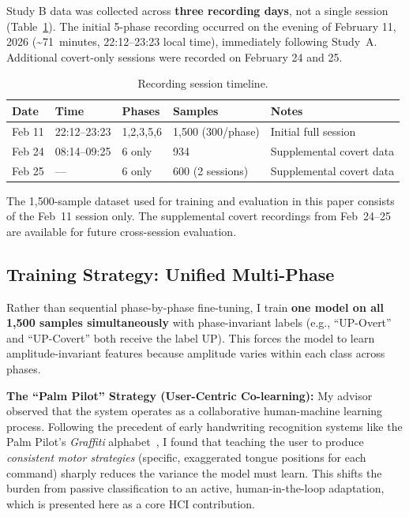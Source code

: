 \documentclass{article}
\begin{document}
Study B data was collected across \textbf{three recording days}, not a single session (Table~\ref{tab:sessions}). The initial 5-phase recording occurred on the evening of February 11, 2026 (\textasciitilde71~minutes, 22:12--23:23 local time), immediately following Study~A. Additional covert-only sessions were recorded on February 24 and 25.

\begin{table}[h]
\centering
\caption{Recording session timeline.}
\label{tab:sessions}
\begin{tabular}{@{}lllll@{}}
\toprule
Date & Time & Phases & Samples & Notes \\
\midrule
Feb 11 & 22:12--23:23 & 1,2,3,5,6 & 1{,}500 (300/phase) & Initial full session \\
Feb 24 & 08:14--09:25 & 6 only      & 934 & Supplemental covert data \\
Feb 25 & ---          & 6 only      & 600 (2 sessions) & Supplemental covert data \\
\bottomrule
\end{tabular}
\end{table}

The 1{,}500-sample dataset used for training and evaluation in this paper consists of the Feb~11 session only. The supplemental covert recordings from Feb~24--25 are available for future cross-session evaluation.

\subsection{Training Strategy: Unified Multi-Phase}

Rather than sequential phase-by-phase fine-tuning, I train \textbf{one model on all 1{,}500 samples simultaneously} with phase-invariant labels (e.g., ``UP-Overt'' and ``UP-Covert'' both receive the label UP). This forces the model to learn amplitude-invariant features because amplitude varies within each class across phases.

\textbf{The ``Palm Pilot'' Strategy (User-Centric Co-learning):} My advisor observed that the system operates as a collaborative human-machine learning process. Following the precedent of early handwriting recognition systems like the Palm Pilot's \emph{Graffiti} alphabet~\cite{palmgraffiti}, I found that teaching the user to produce \emph{consistent motor strategies} (specific, exaggerated tongue positions for each command) sharply reduces the variance the model must learn. This shifts the burden from passive classification to an active, human-in-the-loop adaptation, which is presented here as a core HCI contribution.
\end{document}
